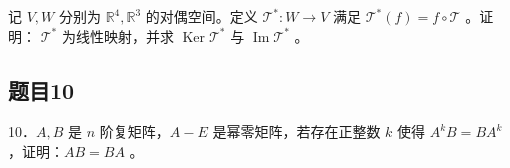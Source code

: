 \documentclass{article}
\begin{document}
记 \(V, W\) 分别为 \(\mathbb{R}^{4}, \mathbb{R}^{3}\) 的对偶空间。定义 \(\mathcal{T}^{*}: W \rightarrow V\) 满足 \(\mathcal{T}^{*}(f)=f \circ \mathcal{T}\) 。证明： \(\mathcal{T}^{*}\) 为线性映射，并求 \(\operatorname{Ker} \mathcal{T}^{*}\) 与 \(\operatorname{Im} \mathcal{T}^{*}\) 。

\subsection{题目10}
10．\(A, B\) 是 \(n\) 阶复矩阵，\(A-E\) 是幂零矩阵，若存在正整数 \(k\) 使得 \(A^{k} B=B A^{k}\) ，证明：\(A B=B A\) 。
\end{document}
